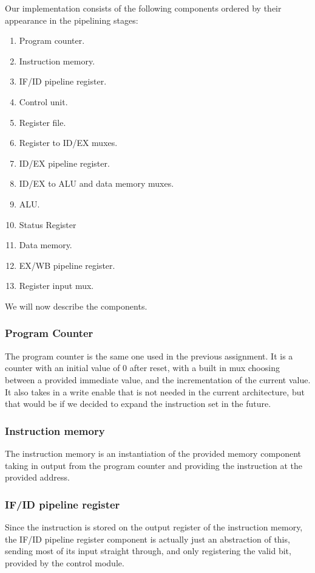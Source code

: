 \documentclass[11pt]{report}
\begin{document}
Our implementation consists of the following components
ordered by their appearance in the pipelining stages:
	
\begin{enumerate}
\item Program counter.
\item Instruction memory.
\item IF/ID pipeline register.
\item Control unit.
\item Register file.
\item Register to ID/EX muxes.
\item ID/EX pipeline register.
\item ID/EX to ALU and data memory muxes.
\item ALU.
\item Status Register
\item Data memory.
\item EX/WB pipeline register.
\item Register input mux.
\end{enumerate}
	
We will now describe the components.
\subsubsection*{Program Counter}
The program counter is the same one used in the previous assignment. 
It is a counter with an initial value of 0 after reset, with a built in
mux choosing between a provided immediate value, and the incrementation of
the current value. It also takes in a write enable that is not needed in
the current architecture, but that would be if we decided to expand the 
instruction set in the future.

\subsubsection*{Instruction memory}
The instruction memory is an instantiation of the provided memory component taking in
output from the program counter and providing the instruction at the provided
address.
\subsubsection*{IF/ID pipeline register}
Since the instruction is stored on the output register of the instruction memory,
the IF/ID pipeline register component is actually just an abstraction of this, sending 
most of its input straight through, and only registering the valid bit, provided by
the control module.
\end{document}
